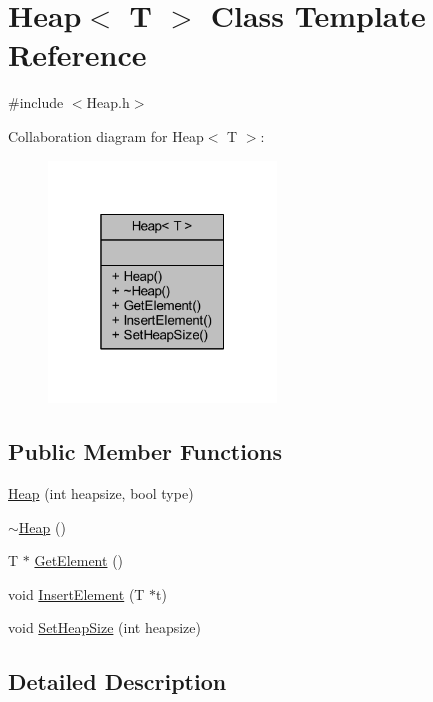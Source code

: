 \hypertarget{class_heap}{}\section{Heap$<$ T $>$ Class Template Reference}
\label{class_heap}


{\ttfamily \#include $<$Heap.\+h$>$}



Collaboration diagram for Heap$<$ T $>$\+:
\nopagebreak
\begin{figure}[H]
\begin{center}
\leavevmode
\includegraphics[width=172pt]{class_heap__coll__graph}
\end{center}
\end{figure}
\subsection*{Public Member Functions}
\begin{DoxyCompactItemize}
\item 
\hyperlink{class_heap_ab0d9672cff1ce2a767ed5c75f2ec9b56}{Heap} (int heapsize, bool type)
\item 
\hyperlink{class_heap_a7887eec294f679fad13d8226ba7b3a44}{$\sim$\+Heap} ()
\item 
T $\ast$ \hyperlink{class_heap_ad3a597474f313c4b8a3d26f8f687afa2}{Get\+Element} ()
\item 
void \hyperlink{class_heap_aad789e01b5acbbebe0cceb62cf824832}{Insert\+Element} (T $\ast$t)
\item 
void \hyperlink{class_heap_a3b6ee5e7df307ff66d7d489c946c1745}{Set\+Heap\+Size} (int heapsize)
\end{DoxyCompactItemize}


\subsection{Detailed Description}
